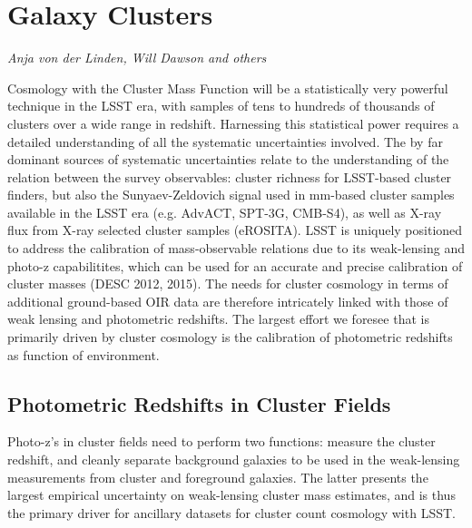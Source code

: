 
\section{Galaxy Clusters}
\label{sec:clusters}
{\it Anja von der Linden, Will Dawson and others}


Cosmology with the Cluster Mass Function will be a statistically very powerful technique in the LSST era, with samples of tens to hundreds of thousands of clusters over a wide range in redshift.  Harnessing this statistical power requires a detailed understanding of all the systematic uncertainties involved.  The by far dominant sources of systematic uncertainties relate to the understanding of the relation between the survey observables: cluster richness for LSST-based cluster finders, but also the Sunyaev-Zeldovich signal used in mm-based cluster samples available in the LSST era (e.g. AdvACT, SPT-3G, CMB-S4), as well as X-ray flux from X-ray selected cluster samples (eROSITA).  LSST is uniquely positioned to address the calibration of mass-observable relations due to its weak-lensing and photo-z capabilitites, which can be used for an accurate and precise calibration of cluster masses (DESC 2012, 2015).  The needs for cluster cosmology in terms of additional ground-based OIR data are therefore intricately linked with those of weak lensing and photometric redshifts.  The largest effort we foresee that is primarily driven by cluster cosmology is the calibration of photometric redshifts as function of environment.



\subsection{Photometric Redshifts in Cluster Fields}

Photo-z's in cluster fields need to perform two functions: measure the cluster redshift, and cleanly separate background galaxies to be used in the weak-lensing measurements from cluster and foreground galaxies.  The latter presents the largest empirical uncertainty on weak-lensing cluster mass estimates, and is thus the primary driver for ancillary datasets for cluster count cosmology with LSST. 


